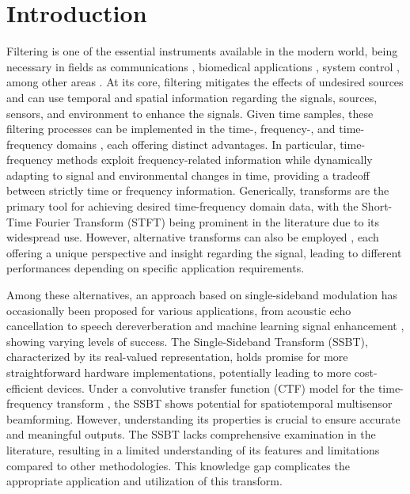 \section{Introduction}
\label{sec:introduction}


Filtering is one of the essential instruments available in the modern world, being necessary in fields as communications \cite{chen_source_2002}, biomedical applications \cite{lobato_worst-case-optimization_2020,lu_biomedical_1994,nguyen_minimum_2017}, system control \cite{han_comparative_2016, hagglund_signal_2012}, among other areas \cite{hathcock_noise_2016,lee_general_2002,shi_new_2004}. At its core, filtering mitigates the effects of undesired sources and can use temporal and spatial information regarding the signals, sources, sensors, and environment to enhance the signals. Given time samples, these filtering processes can be implemented in the time-, frequency-, and time-frequency domains \cite{benesty_fundamentals_2017}, each offering distinct advantages. In particular, time-frequency methods exploit frequency-related information while dynamically adapting to signal and environmental changes in time, providing a tradeoff between strictly time or frequency information. 
Generically, transforms are the primary tool for achieving desired time-frequency domain data, with the Short-Time Fourier Transform (STFT) \cite{kiymik_comparison_2005,pan_microphone_2021} being prominent in the literature due to its widespread use.
However, alternative transforms can also be employed \cite{chen_wavelet-based_2018,yang_general_2014,almeida_fractional_1994}, each offering a unique perspective and insight regarding the signal, leading to different performances depending on specific application requirements.


Among these alternatives, an approach based on single-sideband modulation has occasionally been proposed \cite{crochiere_multirate_1983} for various applications, from acoustic echo cancellation \cite{chin_subband_2001} to speech dereverberation \cite{oyzerman_system_2012} and machine learning signal enhancement \cite{okamoto_subband_2017}, showing varying levels of success. The Single-Sideband Transform (SSBT), characterized by its real-valued representation, holds promise for more straightforward hardware implementations, potentially leading to more cost-efficient devices. Under a convolutive transfer function (CTF) model for the time-frequency transform \cite{talmon_relative_2009}, the SSBT shows potential for spatiotemporal multisensor beamforming. However, understanding its properties is crucial to ensure accurate and meaningful outputs. The SSBT lacks comprehensive examination in the literature, resulting in a limited understanding of its features and limitations compared to other methodologies. This knowledge gap complicates the appropriate application and utilization of this transform.


